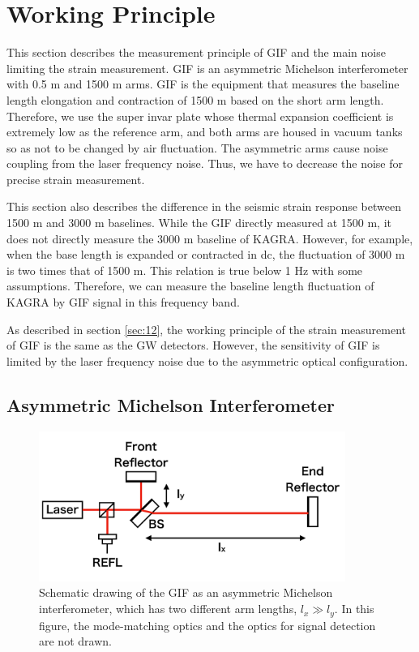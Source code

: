 \section{Working Principle} \label{sec:sec42}
This section describes the measurement principle of GIF and the main noise limiting the strain measurement. GIF is an asymmetric Michelson interferometer with 0.5 m and 1500 m arms. GIF is the equipment that measures the baseline length elongation and contraction of 1500 m based on the short arm length. Therefore, we use the super invar plate whose thermal expansion coefficient is extremely low as the reference arm, and both arms are housed in vacuum tanks so as not to be changed by air fluctuation. The asymmetric arms cause noise coupling from the laser frequency noise. Thus, we have to decrease the noise for precise strain measurement.

This section also describes the difference in the seismic strain response between 1500 m and 3000 m baselines. While the GIF directly measured at 1500 m, it does not directly measure the 3000 m baseline of KAGRA. However, for example, when the base length is expanded or contracted in dc, the fluctuation of 3000 m is two times that of 1500 m. This relation is true below 1 Hz with some assumptions. Therefore, we can measure the baseline length fluctuation of KAGRA by GIF signal in this frequency band. 

As described in section \cref{sec:12}, the working principle of the strain measurement of GIF is the same as the GW detectors. However, the sensitivity of GIF is limited by the laser frequency noise due to the asymmetric optical configuration.


\subsection{Asymmetric Michelson Interferometer}
\begin{figure}[h]
  \centering
  \includegraphics[width=10.0cm]{./img_chap4/img401.png}
  \caption{Schematic drawing of the GIF as an asymmetric Michelson interferometer, which has two different arm lengths, $l_x\gg{l_y}$. In this figure, the mode-matching optics and the optics for signal detection are not drawn.} \label{img:img401}
\end{figure}

